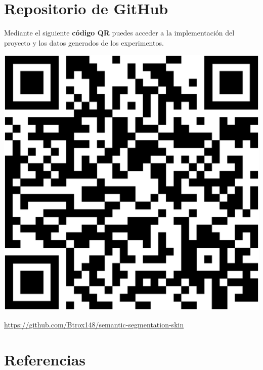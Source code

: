 \documentclass[a0,portrait]{a0poster}
\begin{document}
\begin{multicols}{3}
\section*{Repositorio de GitHub}
Mediante el siguiente \textbf{código QR} puedes acceder a la implementación del proyecto y los datos generados de los experimentos.
\begin{center}
    \includegraphics[scale=0.3]{repoqr.eps}
\end{center}
\small{
\url{https://github.com/Btrox148/semantic-segmentation-skin}
}

\section*{Referencias}

\small
\nocite{adam_opt}
\nocite{Yakubovskiy:2019}
\renewcommand\refname{\vskip -1cm}




\end{multicols}
\end{document}
